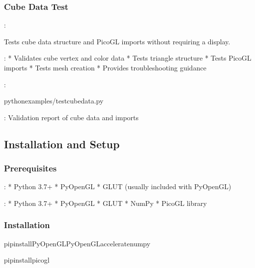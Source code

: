\documentclass[a4paper,10pt,english,openany,oneside]{sphinxmanual}
\begin{document}
\subsubsection{Cube Data Test}
\label{\detokenize{legacy_examples:cube-data-test}}
\sphinxAtStartPar
{}: 

\sphinxAtStartPar
Tests cube data structure and PicoGL imports without requiring a display.

\sphinxAtStartPar
{}:
* Validates cube vertex and color data
* Tests triangle structure
* Tests PicoGL imports
* Tests mesh creation
* Provides troubleshooting guidance

\sphinxAtStartPar
{}:

\begin{sphinxVerbatim}[commandchars=\\\{\}]
pythonexamples/test\PYGZus{}cube\PYGZus{}data.py
\end{sphinxVerbatim}

\sphinxAtStartPar
{}: Validation report of cube data and imports


\subsection{Installation and Setup}
\label{\detokenize{legacy_examples:installation-and-setup}}

\subsubsection{Prerequisites}
\label{\detokenize{legacy_examples:prerequisites}}
\sphinxAtStartPar
{}:
* Python 3.7+
* PyOpenGL
* GLUT (usually included with PyOpenGL)

\sphinxAtStartPar
{}:
* Python 3.7+
* PyOpenGL
* GLUT
* NumPy
* PicoGL library


\subsubsection{Installation}
\label{\detokenize{legacy_examples:installation}}
\begin{sphinxVerbatim}[commandchars=\\\{\}]
pipinstallPyOpenGLPyOpenGL\PYGZus{}acceleratenumpy

pipinstallpicogl
\end{sphinxVerbatim}
\end{document}
